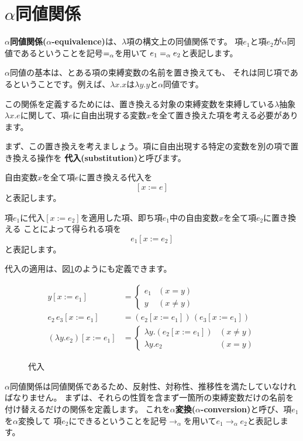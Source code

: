 \section{$\alpha$同値関係}

\textbf{$\alpha$同値関係($\alpha$-equivalence)}は、$\lambda$項の構文上の同値関係です。
項$e_1$と項$e_2$が$\alpha$同値であるということを記号$=_\alpha$を用いて
$e_1 =_\alpha e_2$と表記します。

$\alpha$同値の基本は、とある項の束縛変数の名前を置き換えても、
それは同じ項であるということです。例えば、$\lambda x . x$は$\lambda y . y$と$\alpha$同値です。

この関係を定義するためには、置き換える対象の束縛変数を束縛している$\lambda$抽象
$\lambda x . e$に関して、項$e$に自由出現する変数$x$を全て置き換えた項を考える必要があります。

まず、この置き換えを考えましょう。項に自由出現する特定の変数を別の項で置き換える操作を
\textbf{代入(substitution)}と呼びます。

自由変数$x$を全て項$e$に置き換える代入を
\[
  [x := e]
\]
と表記します。

項$e_1$に代入$[x := e_2]$を適用した項、即ち項$e_1$中の自由変数$x$を全て項$e_2$に置き換える
ことによって得られる項を
\[
  e_1 [x := e_2]
\]
と表記します。

代入の適用は、図\ref{fig:lambda-substitute}のようにも定義できます。

\begin{figure}[htbp]
  \begin{align*}
    y [x := e_1] & = \left \{
      \begin{array}{ll}
        e_1 & (x = y) \\
        y & (x \neq y)
      \end{array}
      \right. \\
    e_2 \, e_3 [x := e_1] & = (e_2 [x := e_1]) \, (e_3 [x := e_1]) \\
    (\lambda y . e_2) [x := e_1] & = \left \{
      \begin{array}{ll}
        \lambda y . (e_2 [x := e_1]) & (x \neq y) \\
        \lambda y . e_2 & (x = y)
      \end{array}
      \right.
  \end{align*}
  \caption{代入}
  \label{fig:lambda-substitute}
\end{figure}

$\alpha$同値関係は同値関係であるため、反射性、対称性、推移性を満たしていなければなりません。
まずは、それらの性質を含まず一箇所の束縛変数だけの名前を付け替えるだけの関係を定義します。
これを\textbf{$\alpha$変換($\alpha$-conversion)}と呼び、項$e_1$を$\alpha$変換して
項$e_2$にできるということを記号$\to_\alpha$を用いて$e_1 \to_\alpha e_2$と表記します。

